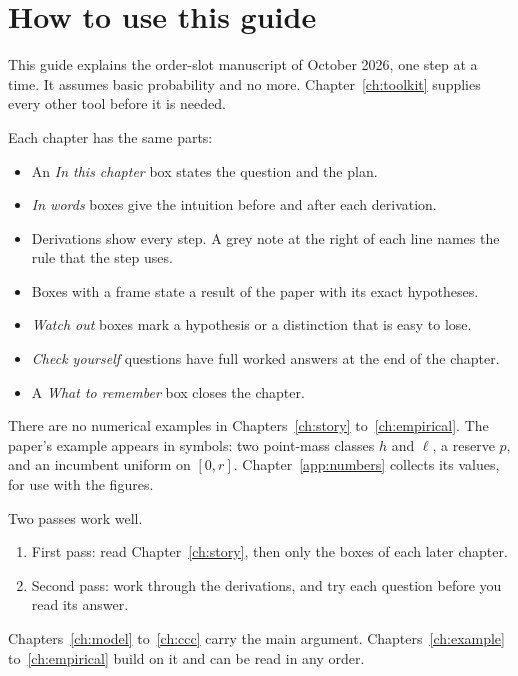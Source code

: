 \chapter{How to use this guide}\label{ch:howto}

This guide explains the order-slot manuscript of October 2026, one step at a time.
It assumes basic probability and no more. Chapter~\ref{ch:toolkit} supplies every other tool before it is needed.

Each chapter has the same parts:
\begin{itemize}
\item An \emph{In this chapter} box states the question and the plan.
\item \emph{In words} boxes give the intuition before and after each derivation.
\item Derivations show every step. A grey note at the right of each line names the rule that the step uses.
\item Boxes with a frame state a result of the paper with its exact hypotheses.
\item \emph{Watch out} boxes mark a hypothesis or a distinction that is easy to lose.
\item \emph{Check yourself} questions have full worked answers at the end of the chapter.
\item A \emph{What to remember} box closes the chapter.
\end{itemize}

There are no numerical examples in Chapters~\ref{ch:story} to~\ref{ch:empirical}.
The paper's example appears in symbols: two point-mass classes \(h\) and \(\ell\), a reserve \(p\), and an incumbent uniform on \([0,r]\).
Chapter~\ref{app:numbers} collects its values, for use with the figures.

Two passes work well.
\begin{enumerate}
\item First pass: read Chapter~\ref{ch:story}, then only the boxes of each later chapter.
\item Second pass: work through the derivations, and try each question before you read its answer.
\end{enumerate}

Chapters~\ref{ch:model} to~\ref{ch:ccc} carry the main argument. Chapters~\ref{ch:example} to~\ref{ch:empirical} build on it and can be read in any order.
